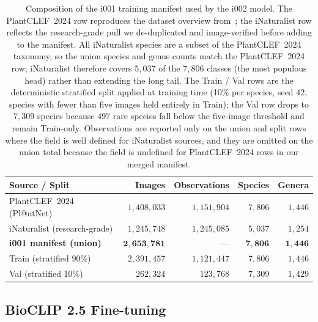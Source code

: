 \begin{table}[ht]
  \centering
  \small
  \setlength{\tabcolsep}{6pt}
  \begin{tabular}{@{}lrrrr@{}}
    \toprule
    Source / Split & Images & Observations & Species & Genera \\
    \midrule
    PlantCLEF~2024 (Pl@ntNet)     & $1{,}408{,}033$ & $1{,}151{,}904$ & $7{,}806$ & $1{,}446$ \\
    iNaturalist (research-grade)  & $1{,}245{,}748$ & $1{,}245{,}085$ & $5{,}037$ & $1{,}254$ \\
    \midrule
    \textbf{i001 manifest (union)}    & $\mathbf{2{,}653{,}781}$ & --- & $\mathbf{7{,}806}$ & $\mathbf{1{,}446}$ \\
    \hspace{1em}Train (stratified 90\%) & $2{,}391{,}457$ & $1{,}121{,}447$ & $7{,}806$ & $1{,}446$ \\
    \hspace{1em}Val (stratified 10\%)   & $262{,}324$     & $123{,}768$     & $7{,}309$ & $1{,}429$ \\
    \bottomrule
  \end{tabular}
  \caption{Composition of the i001 training manifest used by the i002 model. The PlantCLEF~2024 row reproduces the dataset overview from~\cite{goeau2024plantclef}; the iNaturalist row reflects the research-grade pull we de-duplicated and image-verified before adding to the manifest. All iNaturalist species are a subset of the PlantCLEF~2024 taxonomy, so the union species and genus counts match the PlantCLEF~2024 row; iNaturalist therefore covers $5{,}037$ of the $7{,}806$ classes (the most populous head) rather than extending the long tail. The Train / Val rows are the deterministic stratified split applied at training time (10\% per species, seed $42$, species with fewer than five images held entirely in Train); the Val row drops to $7{,}309$ species because $497$ rare species fall below the five-image threshold and remain Train-only. Observations are reported only on the union and split rows where the field is well defined for iNaturalist sources, and they are omitted on the union total because the field is undefined for PlantCLEF~2024 rows in our merged manifest.}
  \label{tab:i001_manifest}
\end{table}

\subsection{BioCLIP 2.5 Fine-tuning}
\label{sec:backbone}


